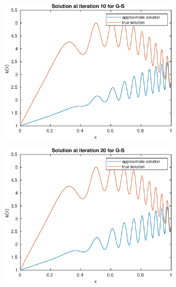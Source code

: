 \documentclass{article}
\begin{document}
\begin{figure}[H]
    \centering
    \begin{subfigure}{0.495\linewidth}
        \centering
        \includegraphics[width=\linewidth]{GS_i=10.eps}
    \end{subfigure}
    \begin{subfigure}{0.495\linewidth}
        \centering
        \includegraphics[width=\linewidth]{GS_i=20.eps}
    \end{subfigure}
    \begin{subfigure}{0.495\linewidth}
        \centering

\end{subfigure}
\end{figure}
\end{document}
